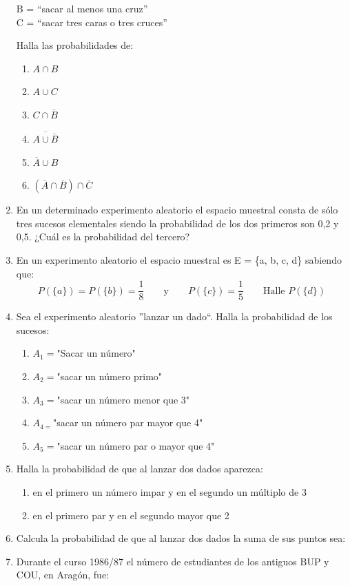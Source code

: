 \documentclass[twoside]{article}
\begin{document}
\begin{enumerate}
\begin{multicols}{2}
  B = “sacar al menos una cruz”\\
  C = “sacar tres caras o tres cruces”\\
\end{multicols}
Halla las probabilidades de:
\begin{multicols}{3}
  \begin{enumerate}
    \item $ A\cap B $
    \item $ A\cup C $
    \item $ C\cap \overline{B} $
    \item $ \overline{A\cup \overline{B}} $
    \item $ \overline{A}\cup B $
    \item $ (\overline{A}\cap\overline{B})\cap \overline{C} $
  \end{enumerate}
\end{multicols}
\item En un determinado experimento aleatorio el espacio muestral consta de sólo tres sucesos elementales siendo la probabilidad de los dos primeros son 0,2 y 0,5. ¿Cuál es la probabilidad del tercero?
\item En un experimento aleatorio el espacio muestral es E = \{a, b, c, d\} sabiendo que:
\[ P(\{a\})=P(\{b\})=\dfrac{1}{8}\qquad \mbox{y}\qquad P(\{c\})=\dfrac{1}{5} \qquad \mbox{Halle }P(\{d\}) \]
\item Sea el experimento aleatorio ''lanzar un dado``. Halla la probabilidad de los sucesos:
\begin{enumerate}
\item $A_{1}=$"Sacar un número"
\item $A_{2}=$"sacar un número primo"
\item $A_{3}=$"sacar un número menor que 3"
\item $A_{4=}$"sacar un número par mayor que 4"
\item $A_{5}=$"sacar un número par o mayor que 4"
\end{enumerate}
\item Halla la probabilidad de que al lanzar dos dados aparezca:
\begin{enumerate}
  \item en el primero un número impar y en el segundo un múltiplo de 3
\item en el primero par y en el segundo mayor que 2
\end{enumerate}
\item Calcula la probabilidad de que al lanzar dos dados la suma de sus puntos sea:
\begin{enumerate}
\end{enumerate}
\item Durante el curso 1986/87 el número de estudiantes de los antiguos BUP y COU, en Aragón, fue:


\end{enumerate}
\end{document}
